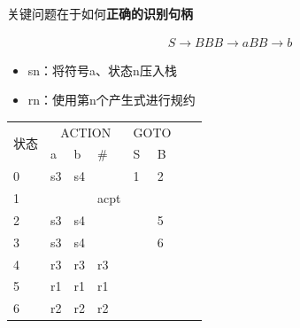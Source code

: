 \documentclass[UTF8]{ctexart} %
\begin{document}
关键问题在于如何\textbf{正确的识别句柄}

\begin{equation}
    \begin{aligned}
        S\rightarrow BB
        B\rightarrow aB
        B\rightarrow b
    \end{aligned}
\end{equation}

\begin{itemize}
    \item sn：将符号a、状态n压入栈
    \item rn：使用第n个产生式进行规约
\end{itemize}

\begin{table}[H]
    \centering
    \begin{tabular}{|p{2cm}<{\centering}|p{1cm}<{\centering}|p{1cm}<{\centering}|p{1cm}<{\centering}|p{1cm}<{\centering}|p{1cm}<{\centering}|p{1cm}<{\centering}|p{1cm}<{\centering}|}
        \hline
        \multirow{2}{*}{状态} & \multicolumn{3}{c|}{ACTION} & \multicolumn{2}{c|}{GOTO}                \\
        \cline{2-6}
        ~                   & a                           & b                         & \#   & S & B \\
        \hline
        0                   & s3                          & s4                        &      & 1 & 2 \\
        \hline
        1                   & ~                           & ~                         & acpt & ~ & ~ \\
        \hline
        2                   & s3                          & s4                        & ~    & ~ & 5 \\
        \hline
        3                   & s3                          & s4                        & ~    & ~ & 6 \\
        \hline
        4                   & r3                          & r3                        & r3   & ~ & ~ \\
        \hline
        5                   & r1                          & r1                        & r1   & ~ & ~ \\
        \hline
        6                   & r2                          & r2                        & r2   & ~ & ~ \\
        \hline
    \end{tabular}
\end{table}
\end{document}
